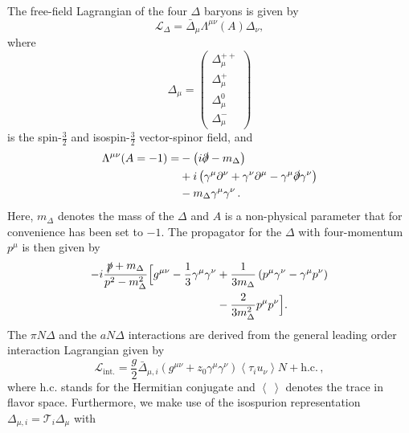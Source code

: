 \documentclass[reprint,amssymb,amsmath,floatfix,aps,prd,groupedaddress,nofootinbib]{revtex4-2}
\newcommand{\tr}[1]{\left\langle #1 \right\rangle}
\begin{document}
The free-field Lagrangian of the four $\Delta$ baryons is given by
\cite{Jenkins:1991es,Tang:1996sq,Hemmert:1997ye,Pascalutsa:2002pi,Hacker:2005fh,Krebs:2008zb}
\begin{equation}
\mathcal{L}_{\Delta} = \bar{\Delta}_\mu \Lambda^{\mu\nu}(A)\Delta_{\nu},
\end{equation}
where
\begin{equation}
\Delta_\mu = \begin{pmatrix}
\Delta^{++}_\mu \\ \Delta^{+}_\mu \\ \Delta^{0}_\mu \\ \Delta^{-}_\mu
\end{pmatrix}
\end{equation}
is the spin-$\tfrac{3}{2}$ and isospin-$\tfrac{3}{2}$ vector-spinor field, and
\begin{align}
\begin{split}
\Lambda^{\mu\nu}(A=-1)= & -\left(i\slashed{\partial}-m_\Delta \right) \\ & +i\left(\gamma^\mu\partial^\nu + \gamma^\nu\partial^\mu-\gamma^\mu\slashed{\partial}\gamma^\nu\right) \\ & - m_\Delta\gamma^\mu\gamma^\nu \,.
\end{split}
\end{align}
Here, $m_\Delta$
denotes the mass of the $\Delta$ and $A$ is a non-physical parameter that for convenience has been
set to $-1$. The propagator for the $\Delta$ with four-momentum $p^\mu$ is then given by
\begin{align}
\begin{split}
-i\frac{\slashed{p}+m_\Delta}{p^2-m_\Delta^2}\Bigl[g^{\mu\nu}-\frac{1}{3}\gamma^\mu\gamma^\nu
 & +\frac{1}{3m_\Delta}\left(p^\mu\gamma^\nu-\gamma^\mu p^\nu\right) \\ & -\frac{2}{3m_\Delta^2}p^\mu p^\nu \Bigr] .
\end{split}
\end{align}
The $\pi N\Delta$ and the $aN\Delta$ interactions are derived from the general leading order interaction
Lagrangian given by \cite{Tang:1996sq,Krebs:2009bf}
\begin{equation}\label{eq:deltainteractionlagr}
\mathcal{L}_\text{int.} = \frac{g}{2} \bar{\Delta}_{\mu,i} \left(g^{\mu\nu}+z_0\gamma^\mu\gamma^\nu \right)
\tr{\tau_i u_\nu} N + \text{h.c.}\,,
\end{equation}
where $\text{h.c.}$ stands for the Hermitian conjugate and $\tr{\ }$ denotes the trace in flavor space.
Furthermore, we make use of the isospurion representation $\Delta_{\mu,i} = \mathcal{T}_i \Delta_\mu$ with
\end{document}
